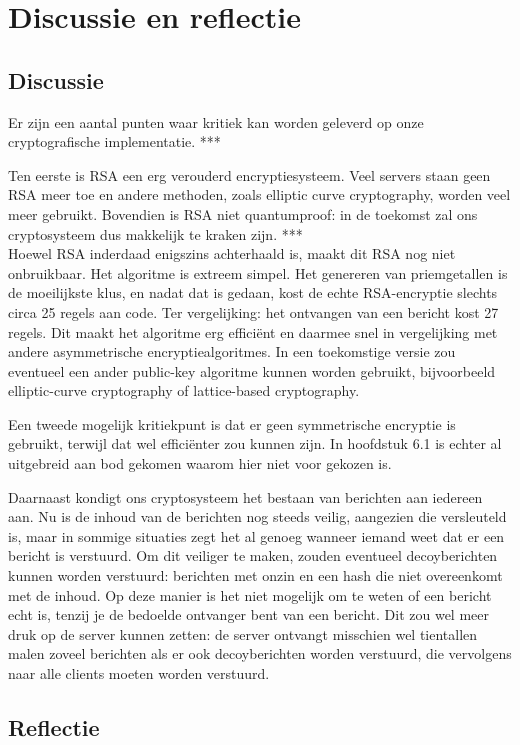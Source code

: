 \documentclass{report} %
\begin{document}
\chapter{Discussie en reflectie}
\section{Discussie} %
Er zijn een aantal punten waar kritiek kan worden geleverd op onze cryptografische implementatie. ***
\par Ten eerste is RSA een erg verouderd encryptiesysteem. Veel servers staan geen RSA meer toe en andere methoden, zoals elliptic curve cryptography, worden veel meer gebruikt. Bovendien is RSA niet quantumproof: in de toekomst zal ons cryptosysteem dus makkelijk te kraken zijn. ***\\
Hoewel RSA inderdaad enigszins achterhaald is, maakt dit RSA nog niet onbruikbaar. Het algoritme is extreem simpel. Het genereren van priemgetallen is de moeilijkste klus, en nadat dat is gedaan, kost de echte RSA-encryptie slechts circa 25 regels aan code. Ter vergelijking: het ontvangen van een bericht kost 27 regels. Dit maakt het algoritme erg efficiënt en daarmee snel in vergelijking met andere asymmetrische encryptiealgoritmes. In een toekomstige versie zou eventueel een ander public-key algoritme kunnen worden gebruikt, bijvoorbeeld elliptic-curve cryptography of lattice-based cryptography. 
\par Een tweede mogelijk kritiekpunt is dat er geen symmetrische encryptie is gebruikt, terwijl dat wel efficiënter zou kunnen zijn. In hoofdstuk 6.1 is echter al uitgebreid aan bod gekomen waarom hier niet voor gekozen is.
\par Daarnaast kondigt ons cryptosysteem het bestaan van berichten aan iedereen aan. Nu is de inhoud van de berichten nog steeds veilig, aangezien die versleuteld is, maar in sommige situaties zegt het al genoeg wanneer iemand weet dat er een bericht is verstuurd. Om dit veiliger te maken, zouden eventueel decoyberichten kunnen worden verstuurd: berichten met onzin en een hash die niet overeenkomt met de inhoud. Op deze manier is het niet mogelijk om te weten of een bericht echt is, tenzij je de bedoelde ontvanger bent van een bericht. Dit zou wel meer druk op de server kunnen zetten: de server ontvangt misschien wel tientallen malen zoveel berichten als er ook decoyberichten worden verstuurd, die vervolgens naar alle clients moeten worden verstuurd.

\section{Reflectie}
\end{document}
